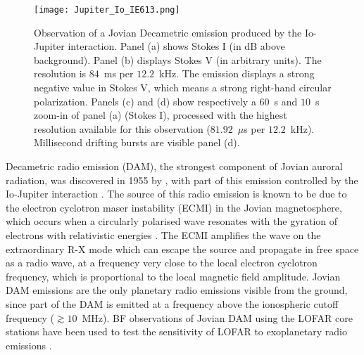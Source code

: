 \begin{figure*}[t]
    \centering
        \texttt{[image: Jupiter\_Io\_IE613.png]}              
    \caption[Observation of a Jovian Decametric emission produced by the Io-Jupiter interaction.]{Observation of a Jovian Decametric emission produced by the Io-Jupiter interaction. Panel (a) shows Stokes I (in dB above background). Panel (b) displays Stokes V (in arbitrary units). The resolution is $84$~ms per $12.2$~kHz. The emission displays a strong negative value in Stokes V, which means a strong right-hand circular polarization. Panels (c) and (d) show respectively a $60$~s and $10$~s zoom-in of panel (a) (Stokes I), processed with the highest resolution available for this observation ($81.92$~$\mu$s per $12.2$~kHz). Millisecond drifting bursts are visible panel (d).}
    \label{fig:io-stokesI}
\end{figure*}


Decametric radio emission (DAM), the strongest component of Jovian auroral radiation, was discovered in 1955 by \cite{Burke1955}, with part of this emission controlled by the Io-Jupiter interaction \citep{Bigg1964}. The source of this radio emission is known to be due to the electron cyclotron maser instability (ECMI) in the Jovian magnetosphere, which occurs when a circularly polarised wave resonates with the gyration of electrons with relativistic energies \citep{Wu1979,Wu1985,Zarka1998, Treumann2006,Louarn2017GRL}. The ECMI amplifies the wave on the extraordinary R-X mode which can escape the source and propagate in free space as a radio wave, at a frequency very close to the local electron cyclotron frequency, which is proportional to the local magnetic field amplitude. Jovian DAM emissions are the only planetary radio emissions visible from the ground, since part of the DAM is emitted at a frequency above the ionospheric cutoff frequency ($\gtrsim 10$~MHz). BF observations of Jovian DAM using the LOFAR core stations have been used to test the sensitivity of LOFAR to exoplanetary radio emissions \citep{Turner2019, Turner2021}.

